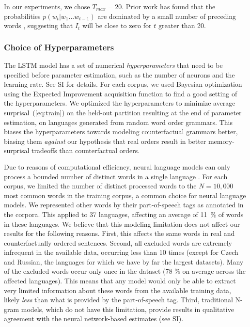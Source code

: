 \documentclass[11pt,letterpaper]{article}
\begin{document}
In our experiments, we chose $T_{max} = 20$. Prior work has found that the probabilities $p(w_t|w_1...w_{t-1})$ are dominated by a small number of preceding words \citep{daniluk2017frustratingly}, suggesting that $I_t$ will be close to zero for $t$ greater than 20.



\subsubsection{Choice of Hyperparameters}

The LSTM model has a set of numerical \emph{hyperparameters} that need to be specified before parameter estimation, such as the number of neurons and the learning rate.
See SI for details.
For each corpus, we used Bayesian optimization using the Expected Improvement acquisition function \citep{snoek-practical-2012} to find a good setting of the hyperparameters.
We optimized the hyperparameters to minimize average surprisal~(\ref{eq:train}) on the held-out partition resulting at the end of parameter estimation, on languages generated from random word order grammars.
This biases the hyperparameters towards modeling counterfactual grammars better, biasing them \emph{against} our hypothesis that real orders result in better memory-surprisal tradeoffs than counterfactual orders.

Due to reasons of computational efficiency, neural language models can only process a bounded number of distinct words in a single language \citep{mikolov-recurrent-2010}.
For each corpus, we limited the number of distinct processed words to the $N=10,000$ most common words in the training corpus, a common choice for neural language models.
We represented other words by their part-of-speech tags as annotated in the corpora.
This applied to 37 languages, affecting an average of 11~\% of words in these languages.
We believe that this modeling limitation does not affect our results for the following reasons.
First, this affects the same words in real and counterfactually ordered sentences.
Second, all excluded words are extremely infrequent in the available data, occurring less than 10 times (except for Czech and Russian, the languages for which we have by far the largest datasets).
Many of the excluded words occur only once in the dataset (78 \% on average across the affected languages).
This means that any model would only be able to extract very limited information about these words from the available training data, likely \emph{less} than what is provided by the part-of-speech tag.
Third, traditional N-gram models, which do not have this limitation, provide results in qualitative agreement with the neural network-based estimates (see SI).
\end{document}
